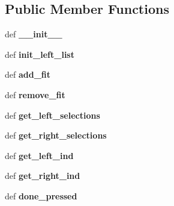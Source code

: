 \subsection*{Public Member Functions}
\begin{DoxyCompactItemize}
\item 
\hypertarget{classpyfrp__subwin_1_1select__fits_a1fbf0a42586ac5060e7368c6bf387dfc}{def {\bfseries \+\_\+\+\_\+init\+\_\+\+\_\+}}\label{classpyfrp__subwin_1_1select__fits_a1fbf0a42586ac5060e7368c6bf387dfc}

\item 
\hypertarget{classpyfrp__subwin_1_1select__fits_a9a08ea6725b2edeb6456b556e47f90db}{def {\bfseries init\+\_\+left\+\_\+list}}\label{classpyfrp__subwin_1_1select__fits_a9a08ea6725b2edeb6456b556e47f90db}

\item 
\hypertarget{classpyfrp__subwin_1_1select__fits_a17e93205af6f16792eac497f6ed92dd2}{def {\bfseries add\+\_\+fit}}\label{classpyfrp__subwin_1_1select__fits_a17e93205af6f16792eac497f6ed92dd2}

\item 
\hypertarget{classpyfrp__subwin_1_1select__fits_a10c248e3a60ba62f4b52feadbee9d39f}{def {\bfseries remove\+\_\+fit}}\label{classpyfrp__subwin_1_1select__fits_a10c248e3a60ba62f4b52feadbee9d39f}

\item 
\hypertarget{classpyfrp__subwin_1_1select__fits_a68537e6d9f865332a1c39abff56026cc}{def {\bfseries get\+\_\+left\+\_\+selections}}\label{classpyfrp__subwin_1_1select__fits_a68537e6d9f865332a1c39abff56026cc}

\item 
\hypertarget{classpyfrp__subwin_1_1select__fits_a0523bfb927e8b82e02d2f9b7787abf1b}{def {\bfseries get\+\_\+right\+\_\+selections}}\label{classpyfrp__subwin_1_1select__fits_a0523bfb927e8b82e02d2f9b7787abf1b}

\item 
\hypertarget{classpyfrp__subwin_1_1select__fits_aeb9de6990840ef029522b3b45265903c}{def {\bfseries get\+\_\+left\+\_\+ind}}\label{classpyfrp__subwin_1_1select__fits_aeb9de6990840ef029522b3b45265903c}

\item 
\hypertarget{classpyfrp__subwin_1_1select__fits_a94e104ecd93347ed63a67efc37049bcc}{def {\bfseries get\+\_\+right\+\_\+ind}}\label{classpyfrp__subwin_1_1select__fits_a94e104ecd93347ed63a67efc37049bcc}

\item 
\hypertarget{classpyfrp__subwin_1_1select__fits_aa51e38b3ebf4e036050b359d67d44d67}{def {\bfseries done\+\_\+pressed}}\label{classpyfrp__subwin_1_1select__fits_aa51e38b3ebf4e036050b359d67d44d67}

\end{DoxyCompactItemize}
